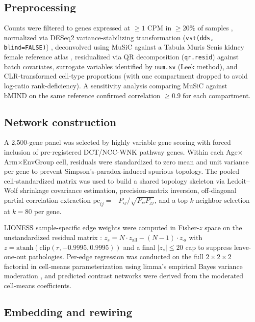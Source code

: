 \documentclass[11pt]{article}
\newcommand{\code}[1]{\texttt{#1}}
\newcommand{\pkg}[1]{\textsf{#1}}
\begin{document}
\subsection{Preprocessing}

Counts were filtered to genes expressed at $\geq 1$ CPM in $\geq 20\%$ of samples \citep{robinson2010edger}, normalized via DESeq2 variance-stabilizing transformation (\code{vst(dds, blind=FALSE)}) \citep{love2014moderated}, deconvolved using \pkg{MuSiC} \citep{wang2019music} against a Tabula Muris Senis kidney female reference atlas \citep{tabula2020}, residualized via QR decomposition (\code{qr.resid}) against batch covariates, surrogate variables identified by \code{num.sv} (Leek method), and CLR-transformed cell-type proportions (with one compartment dropped to avoid log-ratio rank-deficiency). A sensitivity analysis comparing MuSiC against bMIND \citep{wang2021bayesian} on the same reference confirmed correlation $\geq 0.9$ for each compartment.

\subsection{Network construction}

A 2,500-gene panel was selected by highly variable gene scoring with forced inclusion of pre-registered DCT/NCC-WNK pathway genes. Within each Age$\times$Arm$\times$EnvGroup cell, residuals were standardized to zero mean and unit variance per gene to prevent Simpson's-paradox-induced spurious topology. The pooled cell-standardized matrix was used to build a shared topology skeleton via Ledoit--Wolf shrinkage covariance estimation, precision-matrix inversion, off-diagonal partial correlation extraction $\mathrm{pc}_{ij} = -P_{ij}/\sqrt{P_{ii}P_{jj}}$, and a top-$k$ neighbor selection at $k{=}80$ per gene.

LIONESS sample-specific edge weights were computed in Fisher-$z$ space on the unstandardized residual matrix \citep{kuijjer2019estimating}: $z_s = N \cdot z_{\text{all}} - (N{-}1)\cdot z_{\text{-s}}$ with $z = \mathrm{atanh}(\mathrm{clip}(r, -0.9995, 0.9995))$ and a final $|z_s|\leq 20$ cap to suppress leave-one-out pathologies. Per-edge regression was conducted on the full $2{\times}2{\times}2$ factorial in cell-means parameterization using \pkg{limma}'s empirical Bayes variance moderation \citep{ritchie2015limma}, and predicted contrast networks were derived from the moderated cell-means coefficients.

\subsection{Embedding and rewiring}
\end{document}
